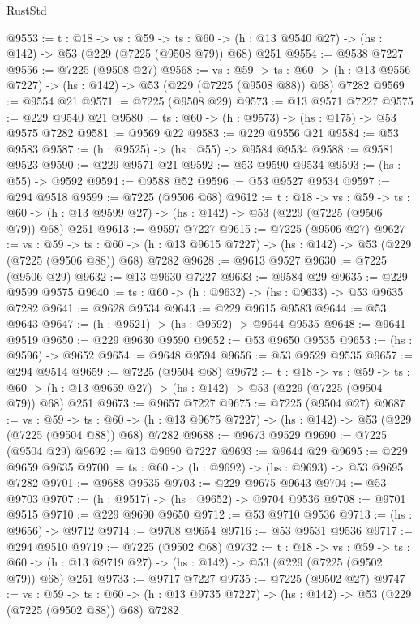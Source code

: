 \begin{lexlean}{RustStd}
\begin{coremodule}
@9553 := {t : @18} ->
  {vs : @59} ->
  {ts : @60} -> (h : @13 @9540 @27) -> (hs : @142) -> @53 (@229 (@7225 (@9508 @79)) @68) @251
@9554 := @9538 @7227
@9556 := @7225 (@9508 @27)
@9568 := {vs : @59} ->
  {ts : @60} -> (h : @13 @9556 @7227) -> (hs : @142) -> @53 (@229 (@7225 (@9508 @88)) @68) @7282
@9569 := @9554 @21
@9571 := @7225 (@9508 @29)
@9573 := @13 @9571 @7227
@9575 := @229 @9540 @21
@9580 := {ts : @60} -> (h : @9573) -> (hs : @175) -> @53 @9575 @7282
@9581 := @9569 @22
@9583 := @229 @9556 @21
@9584 := @53 @9583
@9587 := (h : @9525) -> (hs : @55) -> @9584 @9534
@9588 := @9581 @9523
@9590 := @229 @9571 @21
@9592 := @53 @9590 @9534
@9593 := (hs : @55) -> @9592
@9594 := @9588 @52
@9596 := @53 @9527 @9534
@9597 := @294 @9518
@9599 := @7225 (@9506 @68)
@9612 := {t : @18} ->
  {vs : @59} ->
  {ts : @60} -> (h : @13 @9599 @27) -> (hs : @142) -> @53 (@229 (@7225 (@9506 @79)) @68) @251
@9613 := @9597 @7227
@9615 := @7225 (@9506 @27)
@9627 := {vs : @59} ->
  {ts : @60} -> (h : @13 @9615 @7227) -> (hs : @142) -> @53 (@229 (@7225 (@9506 @88)) @68) @7282
@9628 := @9613 @9527
@9630 := @7225 (@9506 @29)
@9632 := @13 @9630 @7227
@9633 := @9584 @29
@9635 := @229 @9599 @9575
@9640 := {ts : @60} -> (h : @9632) -> (hs : @9633) -> @53 @9635 @7282
@9641 := @9628 @9534
@9643 := @229 @9615 @9583
@9644 := @53 @9643
@9647 := (h : @9521) -> (hs : @9592) -> @9644 @9535
@9648 := @9641 @9519
@9650 := @229 @9630 @9590
@9652 := @53 @9650 @9535
@9653 := (hs : @9596) -> @9652
@9654 := @9648 @9594
@9656 := @53 @9529 @9535
@9657 := @294 @9514
@9659 := @7225 (@9504 @68)
@9672 := {t : @18} ->
  {vs : @59} ->
  {ts : @60} -> (h : @13 @9659 @27) -> (hs : @142) -> @53 (@229 (@7225 (@9504 @79)) @68) @251
@9673 := @9657 @7227
@9675 := @7225 (@9504 @27)
@9687 := {vs : @59} ->
  {ts : @60} -> (h : @13 @9675 @7227) -> (hs : @142) -> @53 (@229 (@7225 (@9504 @88)) @68) @7282
@9688 := @9673 @9529
@9690 := @7225 (@9504 @29)
@9692 := @13 @9690 @7227
@9693 := @9644 @29
@9695 := @229 @9659 @9635
@9700 := {ts : @60} -> (h : @9692) -> (hs : @9693) -> @53 @9695 @7282
@9701 := @9688 @9535
@9703 := @229 @9675 @9643
@9704 := @53 @9703
@9707 := (h : @9517) -> (hs : @9652) -> @9704 @9536
@9708 := @9701 @9515
@9710 := @229 @9690 @9650
@9712 := @53 @9710 @9536
@9713 := (hs : @9656) -> @9712
@9714 := @9708 @9654
@9716 := @53 @9531 @9536
@9717 := @294 @9510
@9719 := @7225 (@9502 @68)
@9732 := {t : @18} ->
  {vs : @59} ->
  {ts : @60} -> (h : @13 @9719 @27) -> (hs : @142) -> @53 (@229 (@7225 (@9502 @79)) @68) @251
@9733 := @9717 @7227
@9735 := @7225 (@9502 @27)
@9747 := {vs : @59} ->
  {ts : @60} -> (h : @13 @9735 @7227) -> (hs : @142) -> @53 (@229 (@7225 (@9502 @88)) @68) @7282

\end{coremodule}
\end{lexlean}
